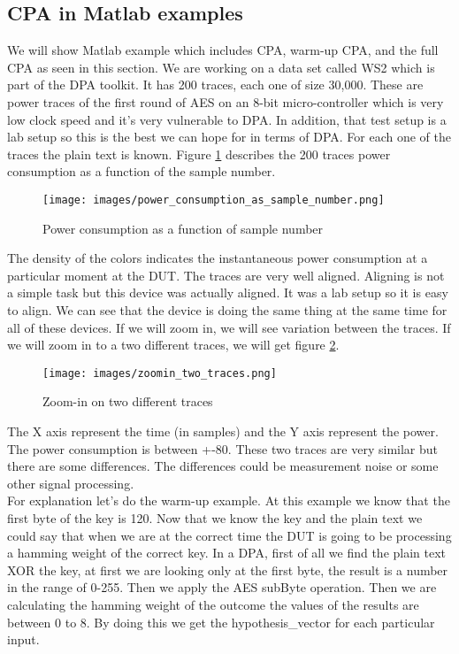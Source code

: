 \subsection{CPA in Matlab examples}\label{c6_Matlab_CPA_example:subsec}
We will show Matlab example which includes CPA, warm-up CPA, and the full CPA as seen in this section.
We are working on a data set called WS2 which is part of the DPA toolkit. It has 200 traces, each one of size 30,000. These are power traces of the first round of AES on an 8-bit micro-controller which is very low clock speed and it’s very vulnerable to DPA. In addition, that test setup is a lab setup so this is the best we can hope for in terms of DPA. For each one of the traces the plain text is known. 
Figure \ref{c8_Matlab_power_as_sample_number:fig} describes the 200 traces power consumption as a function of the sample number. 

\begin{figure}[H]
    \centering
    \texttt{[image: images/power\_consumption\_as\_sample\_number.png]}
    \caption{Power consumption as a function of sample number} \label{c8_Matlab_power_as_sample_number:fig}
\end{figure}
The density of the colors indicates the instantaneous power consumption at a particular moment at the DUT. The traces are very well aligned. Aligning is not a simple task but this device was actually aligned. It was a lab setup so it is easy to align. We can see that the device is doing the same thing at the same time for all of these devices. If we will zoom in, we will see variation between the traces. If we will zoom in to a two different traces, we will get figure \ref{c8_Matlab_zoomin_on_two_traces:fig}.
\begin{figure}[H]
    \centering
    \texttt{[image: images/zoomin\_two\_traces.png]}
    \caption{Zoom-in on two different traces} \label{c8_Matlab_zoomin_on_two_traces:fig}
\end{figure}
The X axis represent the time (in samples) and the Y axis represent the power. The power consumption is between +-80. These two traces are very similar but there are some differences. The differences could be measurement noise or some other signal processing.\\
For explanation let’s do the warm-up example. At this example we know that the first byte of the key is 120. Now that we know the key and the plain text we could say that when we are at the correct time the DUT is going to be processing a hamming weight of the correct key. In a DPA, first of all we find the plain text XOR the key, at first we are looking only at the first byte, the result is a number in the range of 0-255. Then we apply the AES subByte operation. Then we are calculating the hamming weight of the outcome the values of the results are between 0 to 8. By doing this we get the hypothesis\_vector for each particular input.

